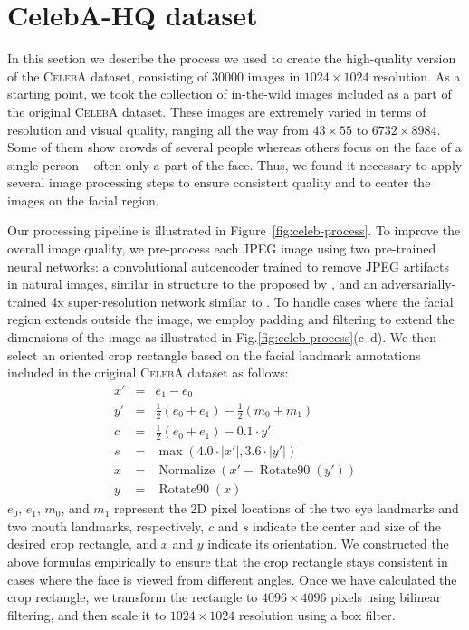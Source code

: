 \documentclass{article}
\begin{document}
\section{CelebA-HQ dataset}
\label{sec:celeb-hq}

In this section we describe the process we used to create the high-quality version of the \textsc{CelebA} dataset, consisting of 30000 images in $1024\times1024$ resolution.
As a starting point, we took the collection of in-the-wild images included as a part of the original \textsc{CelebA} dataset.
These images are extremely varied in terms of resolution and visual quality, ranging all the way from $43\times55$ to $6732\times8984$.
Some of them show crowds of several people whereas others focus on the face of a single person -- often only a part of the face.
Thus, we found it necessary to apply several image processing steps to ensure consistent quality and to center the images on the facial region.

\figcelebprocess

Our processing pipeline is illustrated in Figure~\ref{fig:celeb-process}. To improve the overall image quality, we pre-process each JPEG image using two pre-trained neural networks: a convolutional autoencoder trained to remove JPEG artifacts in natural images, similar in structure to the proposed by \cite{DEJPEG}, and an adversarially-trained 4x super-resolution network \citep{Korobchenko2017} similar to \cite{Ledig2016}. To handle cases where the facial region extends outside the image, we employ padding and filtering to extend the dimensions of the image as illustrated in Fig.\ref{fig:celeb-process}(c--d). We then select an oriented crop rectangle based on the facial landmark annotations included in the original \textsc{CelebA} dataset as follows:
\newcommand{\norm}{\operatorname{Normalize}}
\newcommand{\rotninety}{\operatorname{Rotate90}}
\begin{eqnarray*}
x' &=& e_1 - e_0 \\
y' &=& \frac{1}{2}(e_0 + e_1) - \frac{1}{2}(m_0 + m_1) \\
c &=& \frac{1}{2}(e_0 + e_1) - 0.1 \cdot y' \\
s &=& \max \left( 4.0 \cdot |x'|, 3.6 \cdot |y'| \right) \\
x &=& \norm \left( x' - \rotninety(y') \right) \\
y &=& \rotninety(x)
\end{eqnarray*}
$e_0$, $e_1$, $m_0$, and $m_1$ represent the 2D pixel locations of the two eye landmarks and two mouth landmarks, respectively, $c$ and $s$ indicate the center and size of the desired crop rectangle, and $x$ and $y$ indicate its orientation. We constructed the above formulas empirically to ensure that the crop rectangle stays consistent in cases where the face is viewed from different angles. Once we have calculated the crop rectangle, we transform the rectangle to $4096\times4096$ pixels using bilinear filtering, and then scale it to $1024\times1024$ resolution using a box filter.
\end{document}
